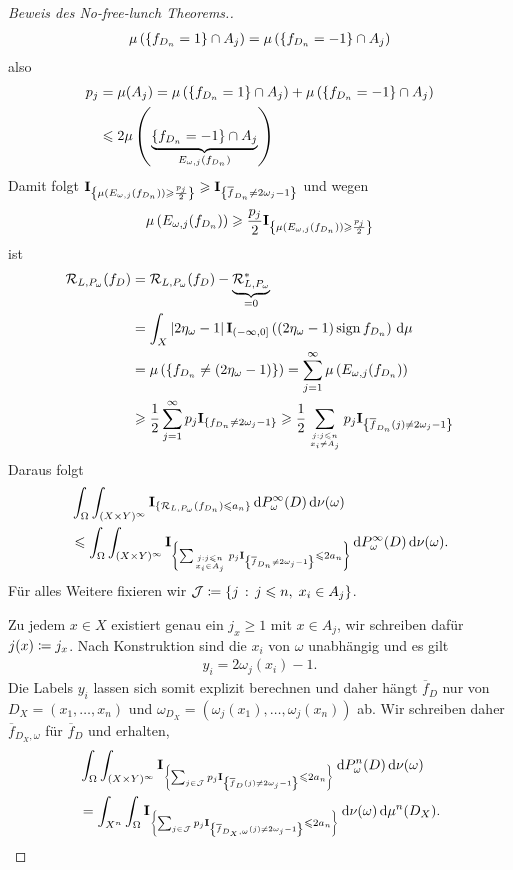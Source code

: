 \begin{proof}[Beweis des No-free-lunch Theorems.]
\begin{align*}
\mu\left(\left\{ f_{D_n}=1 \right\}\cap A_j\right) = \mu\left(\left\{ f_{D_n} = -1 \right\}\cap
A_j\right)
\end{align*}
also
\begin{align*}
p_j &= \mu(A_j) = \mu\left(\left\{ f_{D_n}=1 \right\}\cap A_j \right)
+ \mu\left(\left\{ f_{D_n}=-1 \right\}\cap A_j \right)\\
&\leqslant 2\mu\left(\underbrace{\left\{ f_{D_n}=-1 \right\} \cap
A_j}_{E_{\omega,j}(f_{D_n})}\right)
\end{align*}
Damit folgt
$
\mathbf{I}_{\left\{ \mu(E_{\omega,j}(f_{D_n})) \geqslant \frac{p_j}{2} \right\}} \geqslant
\mathbf{I}_{\left\{ \overline{f}_{D_n} \neq 2\omega_j -1 \right\}}
$
und wegen
\begin{align*}
\mu\left(E_{\omega,j}(f_{D_n}) \right) \geqslant
\frac{p_j}{2}\mathbf{I}_{\left\{ \mu(E_{\omega,j}(f_{D_n}))\geqslant \frac{p_j}{2} \right\}}
\end{align*}
ist
\begin{align*}
\RR_{L,P_\omega}(f_{D}) &= \RR_{L,P_\omega}(f_D) -
\underbrace{\RR_{L,P_\omega}^*}_{=0}\\
&= \int_X \abs{2\eta_\omega -1}\Id_{(-\infty,0]} \left((2\eta_\omega - 1)\sign
f_{D_n} \right)\dmu\\
&=\mu\left(\setd{f_{D_n} \neq (2\eta_\omega -1)}\right)
= \sum_{j=1}^\infty \mu\left(E_{\omega,j}(f_{D_n}) \right)\\
&\ge \frac{1}{2}
\sum_{j=1}^\infty p_j \Id_{\setd{f_{D_n} \neq 2\omega_j -1}}
\ge
\frac{1}{2} \sum_{\atop{j : j\le n}{x_i\neq A_j}} p_j
\Id_{\setd{\overline{f}_{D_n}(j) \neq 2\omega_j -1}}
\end{align*}
Daraus folgt
\begin{align*}
&\int_\Omega\int_{(X\times Y)^\infty}
\Id_{\setd{\RR_{L,P_\omega}(f_{D_n})\le a_n}} \dP_\omega^\infty(D)
\dnu(\omega)\\ &\le
\int_\Omega \int_{(X\times Y)^\infty}
\Id_{\setd{\sum_{\atop{j: j\le n}{x_i\in A_j}} p_j
\Id_{\setd{\overline{f}_{D_n} \neq 2\omega_j-1}}\le 2a_n}}\dP_\omega^\infty(D)
\dnu(\omega).
\end{align*}
Für alles Weitere fixieren wir $\mathcal{J}\coloneq\left\{ j\,:\,j\leqslant n,\; x_i\in A_j\right\}$.

Zu jedem $x\in X$ existiert genau ein $j_x\ge 1$ mit $x\in A_j$, wir schreiben
dafür $j(x) \coloneq j_x$. Nach Konstruktion sind die $x_i$ von $\omega$ unabhängig
und es gilt
\begin{align*}
y_i = 2\omega_j(x_i)-1.
\end{align*}
Die Labels $y_i$ lassen sich somit explizit berechnen
und daher hängt $\overline{f}_D$ nur von $D_X = (x_1,\ldots,x_n)$ und
$\omega_{D_X}=(\omega_j(x_1),\ldots,\omega_j(x_n))$ ab. Wir schreiben daher
$\overline{f}_{D_X,\omega}$ für $\overline{f}_D$ und erhalten,
\begin{align*}
&\int_\Omega \int_{(X\times Y)^\infty} \mathbf{I}_{\left\{ \sum_{j\in\mathcal{J}} p_j
\mathbf{I}_{\left\{ \overline{f}_D(j)\neq 2\omega_j-1 \right\}}\leqslant
2a_n \right\}}\,\mathrm{d} P_\omega^n(D)\,\mathrm{d} \nu(\omega)\\ &=
\int_{X^n}\int_\Omega \mathbf{I}_{\left\{ \sum_{j\in\mathcal{J}} p_j
\mathbf{I}_{\left\{ \overline{f}_{D_X,\omega}(j)\neq 2\omega_j -1 \right\}}\leqslant
2a_n \right\}}\,\mathrm{d} \nu(\omega)\,\mathrm{d} \mu^n(D_X).
\end{align*}


\end{proof}
